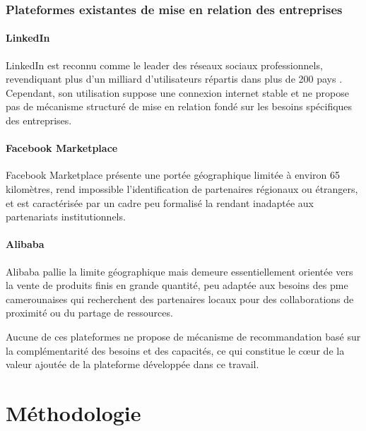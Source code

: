\documentclass[12pt, a4paper, oneside]{report}
\begin{document}
\subsection{Plateformes existantes de mise en relation des entreprises}

\subsubsection{LinkedIn}

LinkedIn est reconnu comme le leader des réseaux sociaux professionnels, revendiquant plus d'un milliard d'utilisateurs répartis dans plus de 200 pays \cite{linkedin2024}. Cependant, son utilisation suppose une connexion internet stable et ne propose pas de mécanisme structuré de mise en relation fondé sur les besoins spécifiques des entreprises.

\subsubsection{Facebook Marketplace}

Facebook Marketplace \cite{meta2024} présente une portée géographique limitée à environ 65 kilomètres, rend impossible l'identification de partenaires régionaux ou étrangers, et est caractérisée par un cadre peu formalisé la rendant inadaptée aux partenariats institutionnels.

\subsubsection{Alibaba}

Alibaba \cite{alibaba2024} pallie la limite géographique mais demeure essentiellement orientée vers la vente de produits finis en grande quantité, peu adaptée aux besoins des \gls{pme} camerounaises qui recherchent des partenaires locaux pour des collaborations de proximité ou du partage de ressources.

Aucune de ces plateformes ne propose de mécanisme de recommandation basé sur la complémentarité des besoins et des capacités, ce qui constitue le cœur de la valeur ajoutée de la plateforme développée dans ce travail.

\chapter{Méthodologie}
\label{chap:methodo}
\end{document}
